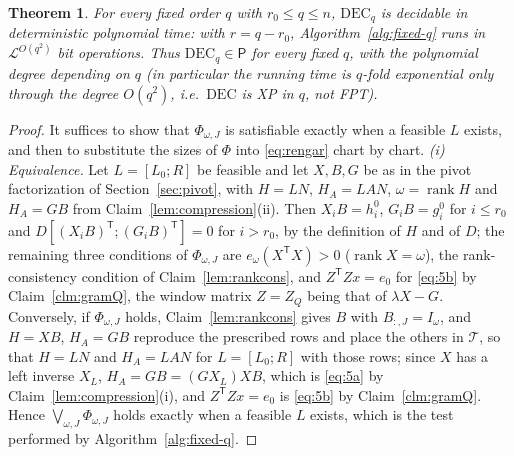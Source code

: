 \documentclass[journal]{IEEEtran}
\theoremstyle{plainn}
\newtheorem{thm}{Theorem}
\theoremstyle{remark}
\begin{document}
\begin{thm}\label{thm:fixedq}
For every fixed order $q$ with $r_0\le q\le n$, $\mathrm{DEC}_q$ is decidable in deterministic
polynomial time: with $r=q-r_0$, Algorithm~\ref{alg:fixed-q} runs in $\mathcal L^{O(q^2)}$ bit
operations. Thus $\mathrm{DEC}_q\in\mathsf P$ for every fixed $q$, with the polynomial degree
depending on $q$ (in particular the running time is $q$-fold exponential only through the degree
$O(q^2)$, i.e.\ $\mathrm{DEC}$ is XP in $q$, not FPT).
\end{thm}

\begin{proof}
It suffices to show that $\Phi_{\omega,J}$ is satisfiable exactly when a feasible $L$ exists, and then
to substitute the sizes of $\Phi$ into \eqref{eq:rengar} chart by chart.
\emph{(i) Equivalence.} Let $L=[L_0;R]$ be feasible and let $X,B,G$ be as in the pivot
factorization of Section~\ref{sec:pivot}, with $H=LN$, $H_A=LAN$, $\omega=\operatorname{rank}H$ and
$H_A=GB$ from Claim~\ref{lem:compression}(ii). Then $X_iB=h_i^0$, $G_iB=g_i^0$ for $i\le r_0$ and
$D[(X_iB)^{\mathsf T};(G_iB)^{\mathsf T}]=0$ for $i>r_0$, by the definition of $H$ and of $D$; the
remaining three conditions of $\Phi_{\omega,J}$ are $e_\omega(X^{\mathsf T}X)>0$
($\operatorname{rank}X=\omega$), the rank-consistency condition of Claim~\ref{lem:rankcons}, and
$Z^{\mathsf T}Zx=e_0$ for \eqref{eq:5b} by Claim~\ref{clm:gramQ}, the window matrix $Z=Z_Q$ being that
of $\lambda X-G$. Conversely, if $\Phi_{\omega,J}$
holds, Claim~\ref{lem:rankcons} gives $B$ with $B_{:,J}=I_\omega$, and $H=XB$, $H_A=GB$ reproduce the
prescribed rows and place the others in $\mathcal T$, so that $H=LN$ and $H_A=LAN$ for $L=[L_0;R]$ with
those rows; since $X$ has a left inverse $X_L$, $H_A=GB=(GX_L)XB$, which is \eqref{eq:5a} by
Claim~\ref{lem:compression}(i), and $Z^{\mathsf T}Zx=e_0$ is \eqref{eq:5b} by
Claim~\ref{clm:gramQ}. Hence $\bigvee_{\omega,J}\Phi_{\omega,J}$ holds exactly when a feasible $L$
exists, which is the test performed by Algorithm~\ref{alg:fixed-q}.


\end{proof}
\end{document}

